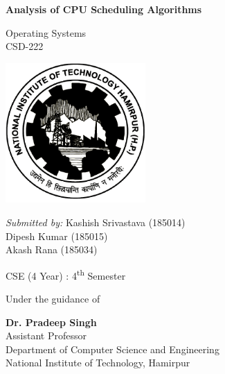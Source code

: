 \documentclass[11pt,a4paper]{report}
\begin{document}
\begin{titlepage}
    \begin{center}

        \Huge{\textbf{Analysis of CPU Scheduling Algorithms}}
 
        \vspace{5pt}
        
        \normalsize
       
        \vspace{5pt}
        
        Operating Systems\\
        CSD-222

    
        \vspace{10pt}
        \includegraphics[width=0.4\textwidth]{./img/logo.png}
        
        \vspace{15pt}
        \textit{Submitted by:}
            Kashish Srivastava (185014)\\
            Dipesh Kumar (185015)\\
            Akash Rana (185034)
        \vspace{5pt}
 
        CSE (4 Year) : 
        4\textsuperscript{th} Semester
 
        \vspace{10pt}
 
        Under the guidance of
        
        \vspace{5pt}
        
        \textbf{Dr. Pradeep Singh }\\
		\large
		Assistant Professor\\ Department of Computer Science and Engineering\\
        National Institute of Technology, Hamirpur\\
      
    \end{center}
\end{titlepage}
\end{document}
